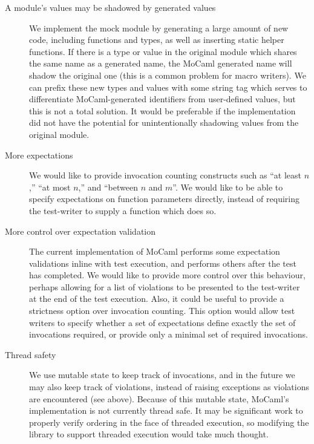 \begin{description}

\item [A module's values may be shadowed by generated values]

  We implement the mock module by generating a large amount of new
  code, including functions and types, as well as inserting static
  helper functions. If there is a type or value in the original module
  which shares the same name as a generated name, the MoCaml generated
  name will shadow the original one (this is a common problem for macro
  writers). We can prefix these new types and values with some string
  tag which serves to differentiate MoCaml-generated identifiers from
  user-defined values, but this is not a total solution. It would be
  preferable if the implementation did not have the potential for
  unintentionally shadowing values from the original module.

  
\item [More expectations]

  We would like to provide invocation counting constructs such as ``at
  least $n$,'' ``at most $n$,'' and ``between $n$ and $m$''. We would
  like to be able to specify expectations on function parameters
  directly, instead of requiring the test-writer to supply a function
  which does so.


\item [More control over expectation validation]

  The current implementation of MoCaml performs some expectation
  validations inline with test execution, and performs others after
  the test has completed. We would like to provide more control over
  this behaviour, perhaps allowing for a list of violations to be
  presented to the test-writer at the end of the test execution. Also,
  it could be useful to provide a strictness option over invocation
  counting. This option would allow test writers to specify whether a
  set of expectations define exactly the set of invocations required,
  or provide only a minimal set of required invocations.

\item [Thread safety]

  We use mutable state to keep track of invocations, and in the future
  we may also keep track of violations, instead of raising exceptions
  as violations are encountered (see above). Because of this mutable
  state, MoCaml's implementation is not currently thread safe. It may
  be significant work to properly verify ordering in the face of
  threaded execution, so modifying the library to support threaded
  execution would take much thought.


\end{description}
